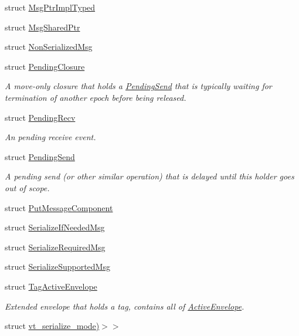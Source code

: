 \begin{DoxyCompactItemize}
struct \hyperlink{structvt_1_1messaging_1_1_msg_ptr_impl_typed}{Msg\+Ptr\+Impl\+Typed}
\item 
struct \hyperlink{structvt_1_1messaging_1_1_msg_shared_ptr}{Msg\+Shared\+Ptr}
\item 
struct \hyperlink{structvt_1_1messaging_1_1_non_serialized_msg}{Non\+Serialized\+Msg}
\item 
struct \hyperlink{structvt_1_1messaging_1_1_pending_closure}{Pending\+Closure}
\begin{DoxyCompactList}\small\item\em A move-\/only closure that holds a {\ttfamily \hyperlink{structvt_1_1messaging_1_1_pending_send}{Pending\+Send}} that is typically waiting for termination of another epoch before being released. \end{DoxyCompactList}\item 
struct \hyperlink{structvt_1_1messaging_1_1_pending_recv}{Pending\+Recv}
\begin{DoxyCompactList}\small\item\em An pending receive event. \end{DoxyCompactList}\item 
struct \hyperlink{structvt_1_1messaging_1_1_pending_send}{Pending\+Send}
\begin{DoxyCompactList}\small\item\em A pending send (or other similar operation) that is delayed until this holder goes out of scope. \end{DoxyCompactList}\item 
struct \hyperlink{structvt_1_1messaging_1_1_put_message_component}{Put\+Message\+Component}
\item 
struct \hyperlink{structvt_1_1messaging_1_1_serialize_if_needed_msg}{Serialize\+If\+Needed\+Msg}
\item 
struct \hyperlink{structvt_1_1messaging_1_1_serialize_required_msg}{Serialize\+Required\+Msg}
\item 
struct \hyperlink{structvt_1_1messaging_1_1_serialize_supported_msg}{Serialize\+Supported\+Msg}
\item 
struct \hyperlink{structvt_1_1messaging_1_1_tag_active_envelope}{Tag\+Active\+Envelope}
\begin{DoxyCompactList}\small\item\em Extended envelope that holds a tag, contains all of {\ttfamily \hyperlink{structvt_1_1messaging_1_1_active_envelope}{Active\+Envelope}}. \end{DoxyCompactList}\item 
struct \hyperlink{structvt_1_1messaging_1_1msg__serialization__mode_3_01_message_t_00_01cxx14__void__t_3_01decltyp859af933e7cec0c00885df897a55208a}{vt\+\_\+serialize\+\_\+mode)$>$$>$}
\end{DoxyCompactItemize}
